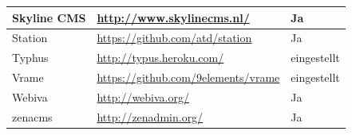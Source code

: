 \begin{table}[!ht]
\begin{tabular}[]{|p{3cm}|p{8cm}|p{4cm}|}
\hline
Skyline CMS & \href{http://www.skylinecms.nl/}{http://www.skylinecms.nl/} & Ja \\
\hline
Station & \href{https://github.com/atd/station}{https://github.com/atd/station} & Ja\\
\hline
Typhus & \href{http://typus.heroku.com/}{http://typus.heroku.com/} & eingestellt\\
\hline
Vrame & \href{https://github.com/9elements/vrame}{https://github.com/9elements/vrame} & eingestellt\\
\hline
Webiva & \href{http://webiva.org/}{http://webiva.org/} & Ja \\
\hline
zenacms & \href{http://zenadmin.org/}{http://zenadmin.org/} & Ja \\
\hline
\end{tabular}
\end{table}

